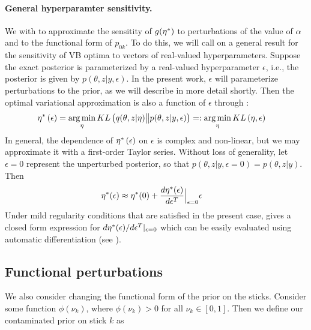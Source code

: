 
\paragraph{General hyperparamter sensitivity.}
We with to approximate the sensitity of $g(\eta^{*})$ to perturbations of the
value of $\alpha$ and to the functional form of $p_{0k}$.  To do this, we will
call on a general result for the sensitivity of VB optima to vectors of
real-valued hyperparameters.  Suppose the exact posterior is parameterized by a
real-valued hyperparameter $\epsilon$, i.e., the posterior is given by
$p\left(\theta, z \vert y, \epsilon\right)$. In the present work, $\epsilon$
will parameterize perturbations to the prior, as we will describe in more detail
shortly.  Then the optimal variational approximation is also a function of
$\epsilon$ through :
%
\begin{align}
    \eta^{*}\left(\epsilon\right) &=
    \operatorname*{arg\,min}_{\eta} KL\left(
        q(\theta, z \vert \eta) \big\| p(\theta, z | y, \epsilon) \right) =:
    \operatorname*{arg\,min}_{\eta} KL\left(\eta, \epsilon\right) \label{eq:pert_kl_objective}
\end{align}
%
In general, the dependence of $\eta^{*}\left(\epsilon\right)$ on $\epsilon$ is
complex and non-linear, but we may approximate it with a first-order Taylor
series. Without loss of generality, let $\epsilon=0$ represent the unperturbed
posterior, so that $p\left(\theta, z \vert y, \epsilon=0\right) = p\left(\theta,
z \vert y \right)$.  Then
%
\begin{align}
\eta^{*}(\epsilon) &\approx
 \eta^{*}(0) +
    \frac{d \eta^{*}(\epsilon)}{d\epsilon^T}\Big|_{\epsilon=0}
    \epsilon \label{eq:our_approximation}
\end{align}
%
Under mild regularity conditions that are satisfied in the present case,
\citet[Theorem 2]{giordano:2017:covariances} gives a closed form
expression for $d \eta^{*}(\epsilon)/ d\epsilon^T \vert_{\epsilon = 0}$
which can be easily evaluated using automatic differentiation
\citep{maclaurin:2015:autograd} (see ).

%

\subsection{Functional perturbations}
\label{sec:func_pert}
%
We also consider changing the functional form of the prior on the sticks.
Consider some function $\phi(\nu_k)$, where $\phi(\nu_k) > 0$ for all $\nu_k \in
[0, 1]$. Then we define our contaminated prior on stick $k$ as

